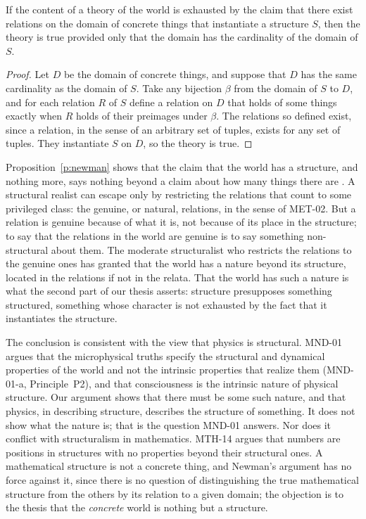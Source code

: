 \documentclass{situationist-preprint}
\begin{document}
\begin{proposition}[Newman]\label{p:newman}
If the content of a theory of the world is exhausted by the claim that there exist relations on the domain of concrete things that instantiate a structure $S$, then the theory is true provided only that the domain has the cardinality of the domain of $S$.
\end{proposition}

\begin{proof}
Let $D$ be the domain of concrete things, and suppose that $D$ has the same cardinality as the domain of $S$. Take any bijection $\beta$ from the domain of $S$ to $D$, and for each relation $R$ of $S$ define a relation on $D$ that holds of some things exactly when $R$ holds of their preimages under $\beta$. The relations so defined exist, since a relation, in the sense of an arbitrary set of tuples, exists for any set of tuples. They instantiate $S$ on $D$, so the theory is true.
\end{proof}

Proposition~\ref{p:newman} shows that the claim that the world has a structure, and nothing more, says nothing beyond a claim about how many things there are \citep{DemopoulosFriedman1985}. A structural realist can escape only by restricting the relations that count to some privileged class: the genuine, or natural, relations, in the sense of MET-02. But a relation is genuine because of what it is, not because of its place in the structure; to say that the relations in the world are genuine is to say something non-structural about them. The moderate structuralist who restricts the relations to the genuine ones has granted that the world has a nature beyond its structure, located in the relations if not in the relata. That the world has such a nature is what the second part of our thesis asserts: structure presupposes something structured, something whose character is not exhausted by the fact that it instantiates the structure.

The conclusion is consistent with the view that physics is structural. MND-01 argues that the microphysical truths specify the structural and dynamical properties of the world and not the intrinsic properties that realize them (MND-01-a, Principle~P2), and that consciousness is the intrinsic nature of physical structure. Our argument shows that there must be some such nature, and that physics, in describing structure, describes the structure of something. It does not show what the nature is; that is the question MND-01 answers. Nor does it conflict with structuralism in mathematics. MTH-14 argues that numbers are positions in structures with no properties beyond their structural ones. A mathematical structure is not a concrete thing, and Newman's argument has no force against it, since there is no question of distinguishing the true mathematical structure from the others by its relation to a given domain; the objection is to the thesis that the \emph{concrete} world is nothing but a structure.
\end{document}
